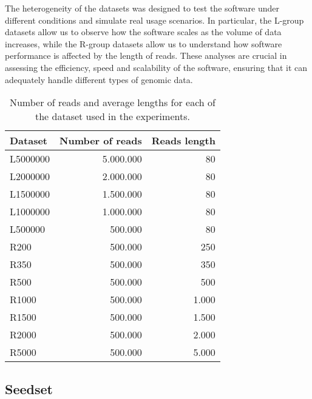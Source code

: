 	The heterogeneity of the datasets was designed to test the software under different conditions and simulate real usage scenarios. In particular, the L-group datasets allow us to observe how the software scales as the volume of data increases, while the R-group datasets allow us to understand how software performance is affected by the length of reads. These analyses are crucial in assessing the efficiency, speed and scalability of the software, ensuring that it can adequately handle different types of genomic data.

	\begin{table}[ht!]
		\centering
		\begin{tabular}{l r r}
			\textbf{Dataset} & \textbf{Number of reads} & \textbf{Reads length} \\
			\toprule
			L5000000 & 5.000.000 & 80 \\
			L2000000 & 2.000.000 & 80 \\
			L1500000 & 1.500.000 & 80 \\
			L1000000 & 1.000.000 & 80 \\
			L500000 & 500.000 & 80 \\
			\midrule
			R200 & 500.000 & 250 \\
			R350 & 500.000 & 350 \\
			R500 & 500.000 & 500 \\
			R1000 & 500.000 & 1.000 \\
			R1500 & 500.000 & 1.500 \\
			R2000 & 500.000 & 2.000 \\
			R5000 & 500.000 & 5.000 \\
			\bottomrule
		\end{tabular}
		\caption{Number of reads and average lengths for each of the dataset used in the experiments.}
		\label{tab:dataset}
	\end{table}




	\subsection{Seedset}
	\label{subsec:seedset}
	
